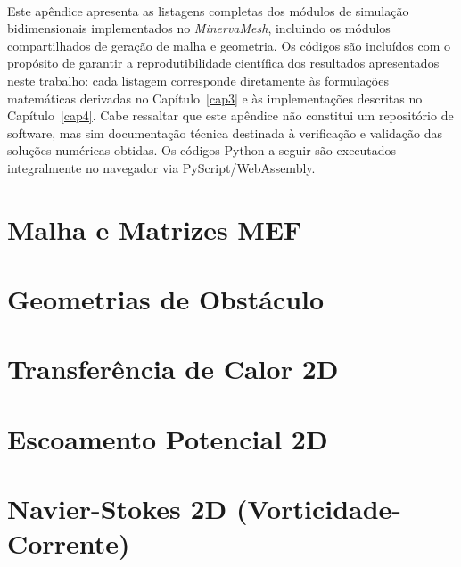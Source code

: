 \paragraph{}Este apêndice apresenta as listagens completas dos módulos de simulação bidimensionais implementados no \textit{MinervaMesh}, incluindo os módulos compartilhados de geração de malha e geometria. Os códigos são incluídos com o propósito de garantir a reprodutibilidade científica dos resultados apresentados neste trabalho: cada listagem corresponde diretamente às formulações matemáticas derivadas no Capítulo~\ref{cap3} e às implementações descritas no Capítulo~\ref{cap4}. Cabe ressaltar que este apêndice não constitui um repositório de software, mas sim documentação técnica destinada à verificação e validação das soluções numéricas obtidas. Os códigos Python a seguir são executados integralmente no navegador via PyScript/WebAssembly.

\section{Malha e Matrizes MEF}
\label{ap:common}



\section{Geometrias de Obstáculo}
\label{ap:geometry}



\section{Transferência de Calor 2D}
\label{ap:transcalor}



\section{Escoamento Potencial 2D}
\label{ap:potencial}



\section{Navier-Stokes 2D (Vorticidade-Corrente)}
\label{ap:ns2d}


